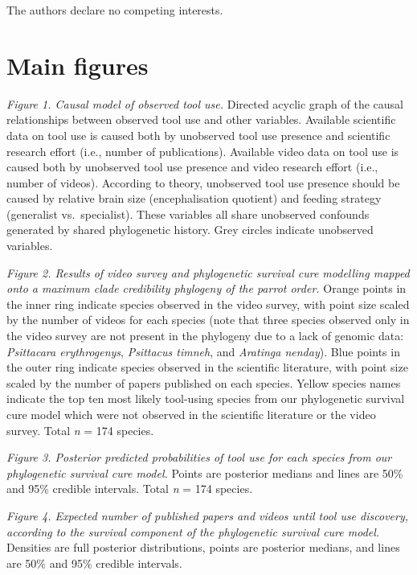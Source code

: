\documentclass[
  man, donotrepeattitle,floatsintext]{apa6}
\begin{document}
The authors declare no competing interests.

\newpage

\hypertarget{main-figures}{%
\section{Main figures}\label{main-figures}}

\emph{Figure 1. Causal model of observed tool use.} Directed acyclic graph
of the causal relationships between observed tool use and other variables.
Available scientific data on tool use is caused both by unobserved tool use
presence and scientific research effort (i.e., number of publications).
Available video data on tool use is caused both by unobserved tool use
presence and video research effort (i.e., number of videos). According to
theory, unobserved tool use presence should be caused by relative brain size
(encephalisation quotient) and feeding strategy (generalist vs.~specialist).
These variables all share unobserved confounds generated by shared phylogenetic
history. Grey circles indicate unobserved variables.

\emph{Figure 2. Results of video survey and phylogenetic survival cure modelling mapped onto a maximum clade credibility phylogeny of the parrot order.}
Orange points in the inner ring indicate species observed in the video survey,
with point size scaled by the number of videos for each species (note that three
species observed only in the video survey are not present in the phylogeny due
to a lack of genomic data: \emph{Psittacara erythrogenys}, \emph{Psittacus timneh}, and
\emph{Aratinga nenday}). Blue points in the outer ring indicate species observed in
the scientific literature, with point size scaled by the number of papers
published on each species. Yellow species names indicate the top ten most likely
tool-using species from our phylogenetic survival cure model which were not
observed in the scientific literature or the video survey. Total \emph{n} =
174 species.

\emph{Figure 3. Posterior predicted probabilities of tool use for each species from our phylogenetic survival cure model.}
Points are posterior medians and lines are 50\% and 95\% credible intervals.
Total \emph{n} = 174 species.

\emph{Figure 4. Expected number of published papers and videos until tool use discovery, according to the survival component of the phylogenetic survival cure model.}
Densities are full posterior distributions, points are
posterior medians, and lines are 50\% and 95\% credible intervals.
\end{document}
